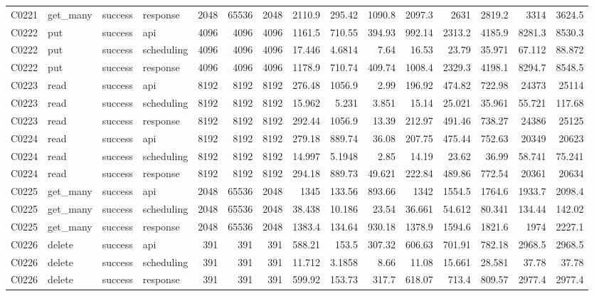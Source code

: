 \begin{landscape}
\begin{longtable}{llllrrrrrrrrrrr}
C0221 & get\_\allowbreak{}many & success & response & 2048 & 65536 & 2048 & 2110.9 & 295.42 & 1090.8 & 2097.3 & 2631 & 2819.2 & 3314 & 3624.5\\
C0222 & put & success & api & 4096 & 4096 & 4096 & 1161.5 & 710.55 & 394.93 & 992.14 & 2313.2 & 4185.9 & 8281.3 & 8530.3\\
C0222 & put & success & scheduling & 4096 & 4096 & 4096 & 17.446 & 4.6814 & 7.64 & 16.53 & 23.79 & 35.971 & 67.112 & 88.872\\
C0222 & put & success & response & 4096 & 4096 & 4096 & 1178.9 & 710.74 & 409.74 & 1008.4 & 2329.3 & 4198.1 & 8294.7 & 8548.5\\
C0223 & read & success & api & 8192 & 8192 & 8192 & 276.48 & 1056.9 & 2.99 & 196.92 & 474.82 & 722.98 & 24373 & 25114\\
C0223 & read & success & scheduling & 8192 & 8192 & 8192 & 15.962 & 5.231 & 3.851 & 15.14 & 25.021 & 35.961 & 55.721 & 117.68\\
C0223 & read & success & response & 8192 & 8192 & 8192 & 292.44 & 1056.9 & 13.39 & 212.97 & 491.46 & 738.27 & 24386 & 25125\\
C0224 & read & success & api & 8192 & 8192 & 8192 & 279.18 & 889.74 & 36.08 & 207.75 & 475.44 & 752.63 & 20349 & 20623\\
C0224 & read & success & scheduling & 8192 & 8192 & 8192 & 14.997 & 5.1948 & 2.85 & 14.19 & 23.62 & 36.99 & 58.741 & 75.241\\
C0224 & read & success & response & 8192 & 8192 & 8192 & 294.18 & 889.73 & 49.621 & 222.84 & 489.86 & 772.54 & 20361 & 20634\\
C0225 & get\_\allowbreak{}many & success & api & 2048 & 65536 & 2048 & 1345 & 133.56 & 893.66 & 1342 & 1554.5 & 1764.6 & 1933.7 & 2098.4\\
C0225 & get\_\allowbreak{}many & success & scheduling & 2048 & 65536 & 2048 & 38.438 & 10.186 & 23.54 & 36.661 & 54.612 & 80.341 & 134.44 & 142.02\\
C0225 & get\_\allowbreak{}many & success & response & 2048 & 65536 & 2048 & 1383.4 & 134.64 & 930.18 & 1378.9 & 1594.6 & 1821.6 & 1974 & 2227.1\\
C0226 & delete & success & api & 391 & 391 & 391 & 588.21 & 153.5 & 307.32 & 606.63 & 701.91 & 782.18 & 2968.5 & 2968.5\\
C0226 & delete & success & scheduling & 391 & 391 & 391 & 11.712 & 3.1858 & 8.66 & 11.08 & 15.661 & 28.581 & 37.78 & 37.78\\
C0226 & delete & success & response & 391 & 391 & 391 & 599.92 & 153.73 & 317.7 & 618.07 & 713.4 & 809.57 & 2977.4 & 2977.4\\

\end{longtable}
\end{landscape}
